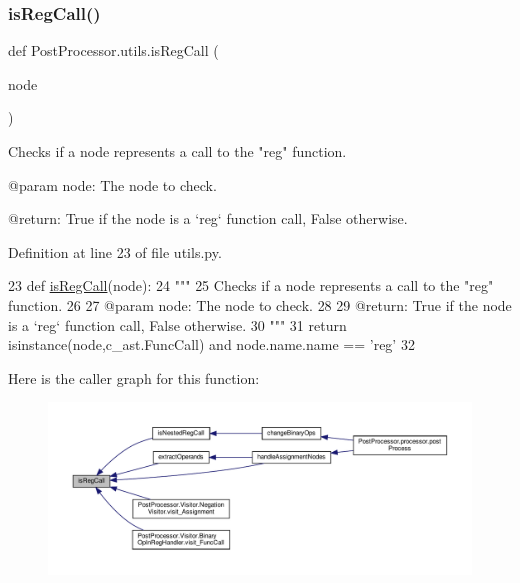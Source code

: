 \subsubsection{\texorpdfstring{is\+Reg\+Call()}{isRegCall()}}
{\footnotesize\ttfamily def Post\+Processor.\+utils.\+is\+Reg\+Call (\begin{DoxyParamCaption}\item[{}]{node }\end{DoxyParamCaption})}

\begin{DoxyVerb}Checks if a node represents a call to the "reg" function.

@param node: The node to check.

@return: True if the node is a `reg` function call, False otherwise.
\end{DoxyVerb}
 

Definition at line 23 of file utils.\+py.


\begin{DoxyCode}
23 \textcolor{keyword}{def }\hyperlink{namespacePostProcessor_1_1utils_a89d6f2461251261de6b862c69fe3c44a}{isRegCall}(node):
24     \textcolor{stringliteral}{"""
}
25 \textcolor{stringliteral}{    Checks if a node represents a call to the "reg" function.
}
26 \textcolor{stringliteral}{
}
27 \textcolor{stringliteral}{    @param node: The node to check.
}
28 \textcolor{stringliteral}{
}
29 \textcolor{stringliteral}{    @return: True if the node is a `reg` function call, False otherwise.
}
30 \textcolor{stringliteral}{    """}
31     \textcolor{keywordflow}{return} isinstance(node,c\_ast.FuncCall) \textcolor{keywordflow}{and} node.name.name == \textcolor{stringliteral}{'reg'}
32 
\end{DoxyCode}
Here is the caller graph for this function\+:\nopagebreak
\begin{figure}[H]
\begin{center}
\leavevmode
\includegraphics[width=350pt]{namespacePostProcessor_1_1utils_a89d6f2461251261de6b862c69fe3c44a_icgraph}
\end{center}
\end{figure}
\mbox{\label{namespacePostProcessor_1_1utils_a379c264b5800e073d327d90d53cb854f}} 
